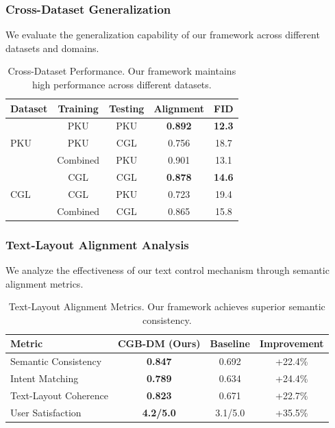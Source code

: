 \documentclass[journal,article,submit,pdftex,moreauthors]{Definitions/mdpi}
\begin{document}
\subsubsection{Cross-Dataset Generalization}

We evaluate the generalization capability of our framework across different datasets and domains.

\begin{table}[H]
\caption{Cross-Dataset Performance. Our framework maintains high performance across different datasets.\label{tab:cross_dataset}}
\begin{tabularx}{\textwidth}{lcccc}
\toprule
\textbf{Dataset} & \textbf{Training} & \textbf{Testing} & \textbf{Alignment} & \textbf{FID}\\
\midrule
\multirow{3}{*}{PKU} & PKU & PKU & \textbf{0.892} & \textbf{12.3}\\
 & PKU & CGL & 0.756 & 18.7\\
 & Combined & PKU & 0.901 & 13.1\\
\midrule
\multirow{3}{*}{CGL} & CGL & CGL & \textbf{0.878} & \textbf{14.6}\\
 & CGL & PKU & 0.723 & 19.4\\
 & Combined & CGL & 0.865 & 15.8\\
\bottomrule
\end{tabularx}
\end{table}

\subsubsection{Text-Layout Alignment Analysis}

We analyze the effectiveness of our text control mechanism through semantic alignment metrics.

\begin{table}[H]
\caption{Text-Layout Alignment Metrics. Our framework achieves superior semantic consistency.\label{tab:text_alignment}}
\begin{tabularx}{\textwidth}{lccc}
\toprule
\textbf{Metric} & \textbf{CGB-DM (Ours)} & \textbf{Baseline} & \textbf{Improvement}\\
\midrule
Semantic Consistency & \textbf{0.847} & 0.692 & +22.4\%\\
Intent Matching & \textbf{0.789} & 0.634 & +24.4\%\\
Text-Layout Coherence & \textbf{0.823} & 0.671 & +22.7\%\\
User Satisfaction & \textbf{4.2/5.0} & 3.1/5.0 & +35.5\%\\
\bottomrule
\end{tabularx}
\end{table}
\end{document}
